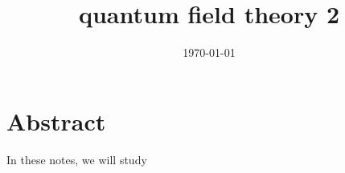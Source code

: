 \documentclass[a4paper, 12pt]{memoir}
\title{quantum field theory 2}
\date{\today}
\begin{document}
\frontmatter



\tableofcontents

\mainmatter



\chapter*{Abstract}

    In these notes, we will study
    


\backmatter

\clearpage
{}
\printbibliography
\end{document}
